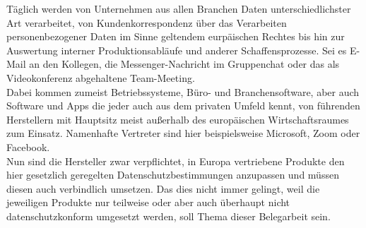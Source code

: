 Täglich werden von Unternehmen aus allen Branchen Daten unterschiedlichster Art verarbeitet, von Kundenkorrespondenz über das Verarbeiten personenbezogener Daten im Sinne geltendem eurpäischen Rechtes bis hin zur Auswertung interner Produktionsabläufe und anderer Schaffensprozesse. Sei es E-Mail an den Kollegen, die Messenger-Nachricht im Gruppenchat oder das als Videokonferenz abgehaltene Team-Meeting.\\
Dabei kommen zumeist Betriebssysteme, Büro- und Branchensoftware, aber auch Software und Apps die jeder auch aus dem privaten Umfeld kennt, von führenden Herstellern mit Hauptsitz meist außerhalb des europäischen Wirtschaftsraumes zum Einsatz. Namenhafte Vertreter sind hier beispielsweise Microsoft, Zoom oder Facebook.\\
Nun sind die Hersteller zwar verpflichtet, in Europa vertriebene Produkte den hier gesetzlich geregelten Datenschutzbestimmungen anzupassen und müssen diesen auch verbindlich umsetzen. Das dies nicht immer gelingt, weil die jeweiligen Produkte nur teilweise oder aber auch überhaupt nicht datenschutzkonform umgesetzt werden, soll Thema dieser Belegarbeit sein.
